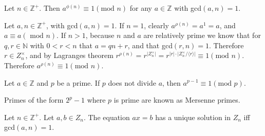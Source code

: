 \documentclass{article}
\begin{document}
\begin{thm}
	Let \(n\in\mathbb{Z}^+\). Then \(a^{\phi(n)}\equiv 1(\text{mod }n)\) for any \(a\in\mathbb{Z}\) with gcd\((a,n)=1\).
	\begin{IEEEproof}
		Let \(a,n\in\mathbb{Z^+}\), with gcd\((a,n)=1\). If \(n=1\), clearly \(a^{\rho(n)}=a^1=a\), and \(a\equiv a(\text{ mod }n)\). If \(n>1\), because \(n\) and \(a\) are relatively prime we know that for \(q,r\in\mathbb{N}\) with \(0<r<n\) that \(a=qn+r\), and that gcd\((r,n)=1\). Therefore \(r\in Z_n^\times\), and by Lagranges theorem \(r^{\rho(n)}=r^{\lvert Z_n^\times\rvert}=r^{\lvert r\rvert\cdot\lvert Z_n^\times/\langle r\rangle\rvert}\equiv 1(\text{mod }n)\). Therefore \(a^{\rho(n)}\equiv 1(\text{mod }n)\).
	\end{IEEEproof}
\end{thm}
\begin{thm}
	Let \(a\in\mathbb{Z}\) and \(p\) be a prime. If \(p\) does not divide \(a\), then \(a^{p-1}\equiv 1(\text{mod }p)\).
\end{thm}
\begin{defi}
	Primes of the form \(2^{p}-1\) where \(p\) is prime are known as Mersenne primes.
\end{defi}
\begin{thm}
	Let \(n\in\mathbb{Z}^+\). Let \(a,b\in Z_n\). The equation \(ax=b\) has a unique solution in \(Z_n\) iff gcd\((a,n)=1\).
\end{thm}
\end{document}
